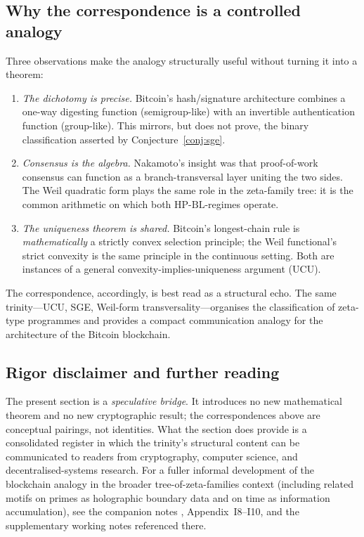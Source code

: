 \documentclass[11pt]{article}
\theoremstyle{definition}
\theoremstyle{remark}
\newcommand{\HBL}{\mathrm{HP\text{-}BL}}
\begin{document}
\subsection{Why the correspondence is a controlled analogy}
\label{sec:blockchain-substance}

Three observations make the analogy structurally useful without
turning it into a theorem:

\begin{enumerate}
\item \emph{The dichotomy is precise.} Bitcoin's hash/signature
architecture combines a one-way digesting function (semigroup-like)
with an invertible authentication function (group-like). This mirrors,
but does not prove, the binary classification asserted by
Conjecture~\ref{conj:sge}.

\item \emph{Consensus is the algebra.} Nakamoto's insight was that
proof-of-work consensus can function as a branch-transversal layer
uniting the two sides. The Weil quadratic form plays the same role
in the zeta-family tree: it is the common arithmetic on which both
$\HBL$-regimes operate.

\item \emph{The uniqueness theorem is shared.} Bitcoin's longest-chain
rule is \emph{mathematically} a strictly convex selection principle;
the Weil functional's strict convexity is the same principle in the
continuous setting. Both are instances of a general convexity-implies-uniqueness
argument (UCU).
\end{enumerate}

The correspondence, accordingly, is best read as a structural echo.
The same trinity---UCU, SGE, Weil-form transversality---organises the
classification of zeta-type programmes and provides a compact
communication analogy for the architecture of the Bitcoin blockchain.

\subsection{Rigor disclaimer and further reading}
\label{sec:blockchain-disclaimer}

The present section is a \emph{speculative bridge}. It introduces
no new mathematical theorem and no new cryptographic result; the
correspondences above are conceptual pairings, not identities.
What the section does provide is a consolidated register in which
the trinity's structural content can be communicated to readers
from cryptography, computer science, and decentralised-systems
research. For a fuller informal development of the blockchain
analogy in the broader tree-of-zeta-families context (including
related motifs on primes as holographic boundary data and on time
as information accumulation), see the companion notes
\cite{MetaGalerkinBridge}, Appendix~I8--I10, and the supplementary
working notes referenced there.
\end{document}
